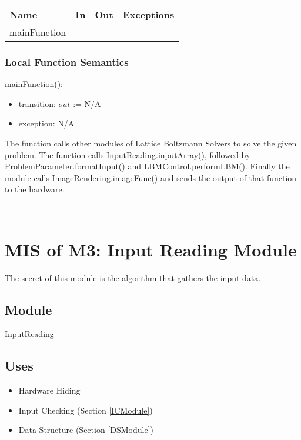 \documentclass[12pt, titlepage]{article}
\newcommand{\famname}{Lattice Boltzmann Solvers}
\begin{document}
\begin{center}
	\begin{tabular}{p{4cm} p{4cm} p{2cm} p{2cm}}
		\hline
		\textbf{Name} & \textbf{In} & \textbf{Out} & \textbf{Exceptions} \\
		\hline
		mainFunction & - & - &- \\
		\hline
	\end{tabular}
\end{center}

\subsubsection{Local Function Semantics}

\noindent mainFunction():
\begin{itemize}
	\item transition: $out$ := N/A
	\item exception: N/A
\end{itemize}

The function calls other modules of {\famname} to solve the given problem. The
function calls InputReading.inputArray(), followed by
ProblemParameter.formatInput() and LBMControl.performLBM(). Finally the module
calls ImageRendering.imageFunc() and sends the output of that function to the
hardware. 


~\newpage

\section{MIS of M3: Input Reading Module} \label{IRModule} 

The secret of this module is the algorithm that gathers the input data.

\subsection{Module}

InputReading

\subsection{Uses}

\begin{itemize}
	\item Hardware Hiding
	\item Input Checking (Section \ref{ICModule})
	\item Data Structure (Section \ref{DSModule})
\end{itemize}
\end{document}
